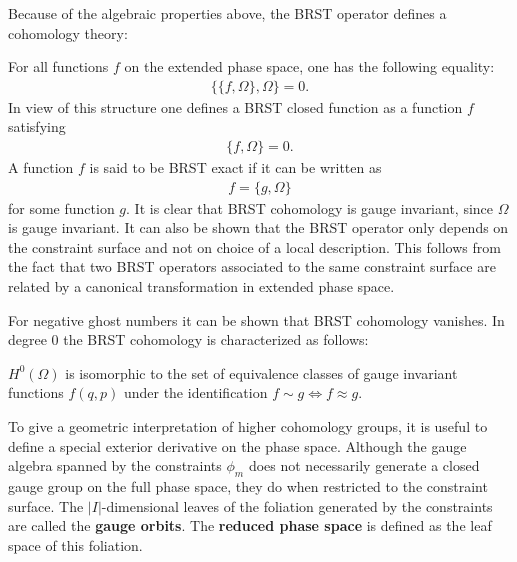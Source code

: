     Because of the algebraic properties above, the BRST operator defines a cohomology theory:
    \begin{property}
        For all functions $f$ on the extended phase space, one has the following equality:
        \begin{gather}
            \{\{f,\Omega\},\Omega\} = 0.
        \end{gather}
        In view of this structure one defines a BRST closed function as a function $f$ satisfying
        \begin{gather}
            \{f,\Omega\} = 0.
        \end{gather}
        A function $f$ is said to be BRST exact if it can be written as
        \begin{gather}
            f = \{g,\Omega\}
        \end{gather}
        for some function $g$. It is clear that BRST cohomology is gauge invariant, since $\Omega$ is gauge invariant. It can also be shown that the BRST operator only depends on the constraint surface and not on choice of a local description. This follows from the fact that two BRST operators associated to the same constraint surface are related by a canonical transformation in extended phase space.
    \end{property}

    For negative ghost numbers it can be shown that BRST cohomology vanishes. In degree 0 the BRST cohomology is characterized as follows:
    \begin{property}\label{lagrange:brst_0}
        $H^0(\Omega)$ is isomorphic to the set of equivalence classes of gauge invariant functions $f(q,p)$ under the identification $f\sim g\iff f\approx g$.
    \end{property}

    To give a geometric interpretation of higher cohomology groups, it is useful to define a special exterior derivative on the phase space. Although the gauge algebra spanned by the constraints $\phi_m$ does not necessarily generate a closed gauge group on the full phase space, they do when restricted to the constraint surface. The $|I|$-dimensional leaves of the foliation generated by the constraints are called the \textbf{gauge orbits}. The \textbf{reduced phase space} is defined as the leaf space of this foliation.


